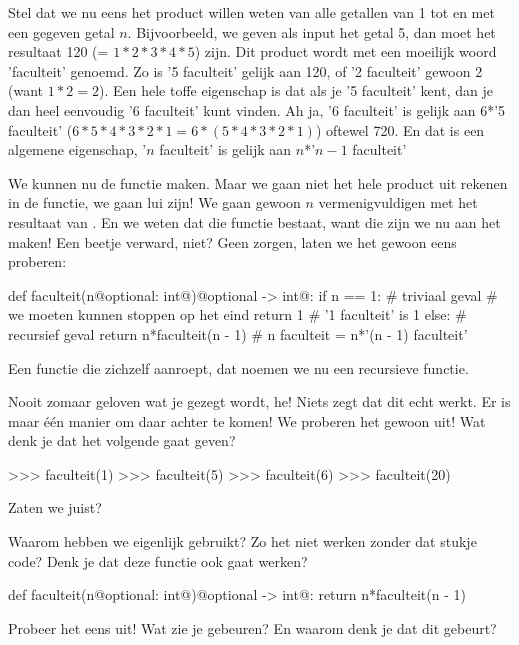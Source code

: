 Stel dat we nu eens het product willen weten van alle getallen van 1 tot en met een gegeven getal $n$.
Bijvoorbeeld, we geven als input het getal 5, dan moet het resultaat 120 (= $1*2*3*4*5$) zijn.
Dit product wordt met een moeilijk woord 'faculteit' genoemd.
Zo is '5 faculteit' gelijk aan 120, of '2 faculteit' gewoon 2 (want $1*2 = 2$).
Een hele toffe eigenschap is dat als je '5 faculteit' kent, dan je dan heel eenvoudig '6 faculteit' kunt vinden.
Ah ja, '6 faculteit' is gelijk aan 6*'5 faculteit' ($6*5*4*3*2*1 = 6*(5*4*3*2*1)$) oftewel 720.
En dat is een algemene eigenschap, '$n$ faculteit' is gelijk aan $n$*'$n - 1$ faculteit'
\par
We kunnen nu de functie  maken.
Maar we gaan niet het hele product uit rekenen in de functie, we gaan lui zijn!
We gaan gewoon $n$ vermenigvuldigen met het resultaat van .
En we weten dat die functie  bestaat, want die zijn we nu aan het maken!
Een beetje verward, niet?
Geen zorgen, laten we het gewoon eens proberen:
\begin{pyEnv}
def faculteit(n@optional: int@)@optional -> int@:
	if n == 1:              # triviaal geval
		                    # we moeten kunnen stoppen op het eind
		return 1            # '1 faculteit' is 1
	else:                   # recursief geval
		return n*faculteit(n - 1)  # n faculteit = n*'(n - 1) faculteit'
\end{pyEnv}
Een functie die zichzelf aanroept, dat noemen we nu een recursieve functie.

\begin{letsTryOut}
	Nooit zomaar geloven wat je gezegt wordt, he!
	Niets zegt dat dit echt werkt.
	Er is maar \'e\'en manier om daar achter te komen!
	\newline
	We proberen het gewoon uit!
	Wat denk je dat het volgende gaat geven?
\begin{pyEnv}
>>> faculteit(1)
>>> faculteit(5)
>>> faculteit(6)
>>> faculteit(20)
\end{pyEnv}
	Zaten we juist?
\end{letsTryOut}

\begin{letsTryOut}
	Waarom hebben we eigenlijk  gebruikt?
	Zo het niet werken zonder dat stukje code?
	Denk je dat deze functie ook gaat werken?
\begin{pyEnv}
def faculteit(n@optional: int@)@optional -> int@:
	return n*faculteit(n - 1)
\end{pyEnv}
	Probeer het eens uit!
	\newline
	Wat zie je gebeuren?
	En waarom denk je dat dit gebeurt?
\end{letsTryOut}

